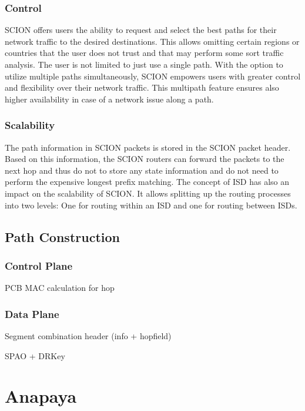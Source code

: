 \subsubsection{Control}

SCION offers users the ability to request and select the best paths for their network traffic to the desired destinations.
This allows omitting certain regions or countries that the user does not trust and that may perform some sort traffic analysis.
The user is not limited to just use a single path.
With the option to utilize multiple paths simultaneously, SCION empowers users with greater control and flexibility over their network traffic.
This multipath feature ensures also higher availability in case of a network issue along a path.


\subsubsection{Scalability}

The path information in SCION packets is stored in the SCION packet header.
Based on this information, the SCION routers can forward the packets to the next hop and thus do not to store any state information and do not need to perform the expensive longest prefix matching.
The concept of ISD has also an impact on the scalability of SCION.
It allows splitting up the routing processes into two levels:
One for routing within an ISD and one for routing between ISDs.


\subsection{Path Construction}

\subsubsection{Control Plane}
PCB
MAC calculation for hop
\subsubsection{Data Plane}
Segment combination
header (info + hopfield)



SPAO + DRKey

\section{Anapaya}




